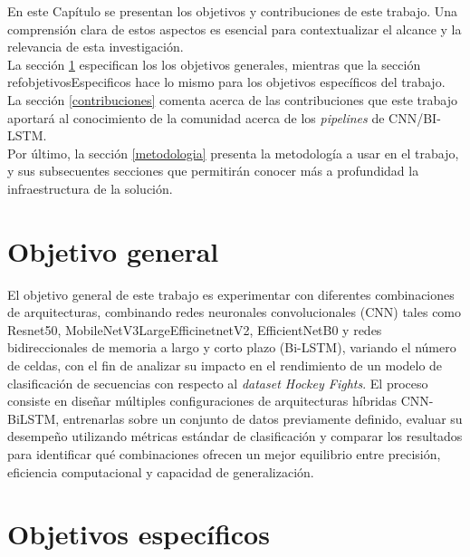 \label{objetivos}
En este Capítulo se presentan los objetivos y contribuciones 
de este trabajo. Una comprensión clara de estos aspectos es 
esencial para contextualizar el alcance y la relevancia de 
esta investigación. \\ 

La sección \ref{objetivoGeneral} especifican los los objetivos 
generales, mientras que la sección ref{objetivosEspecificos} 
hace lo mismo para los objetivos específicos del trabajo.\\

La sección \ref{contribuciones} comenta acerca de las contribuciones 
que este trabajo aportará al conocimiento de la comunidad acerca de 
los \textit{pipelines} de CNN/BI-LSTM.\\

Por último, la sección \ref{metodologia} presenta la metodología 
a usar en el trabajo, y sus subsecuentes secciones que permitirán 
conocer más a profundidad la infraestructura de la solución.

\section{Objetivo general}\label{objetivoGeneral}

El objetivo general de este trabajo es experimentar con 
diferentes combinaciones de arquitecturas, combinando  
redes neuronales convolucionales (CNN) tales como Resnet50, 
MobileNetV3LargeEfficinetnetV2, EfficientNetB0 y redes bidireccionales 
de memoria a largo y corto plazo (Bi-LSTM), variando el número 
de celdas, con el fin de analizar su impacto en el rendimiento de 
un modelo de clasificación de secuencias con respecto al 
\textit{dataset Hockey Fights}. El proceso consiste 
en diseñar múltiples configuraciones de arquitecturas híbridas 
CNN-BiLSTM, entrenarlas sobre un conjunto de datos previamente 
definido, evaluar su desempeño utilizando métricas estándar de 
clasificación y comparar los resultados para identificar qué 
combinaciones ofrecen un mejor equilibrio entre precisión, 
eficiencia computacional y capacidad de generalización.

\section{Objetivos específicos}\label{objetivosEspecificos}

